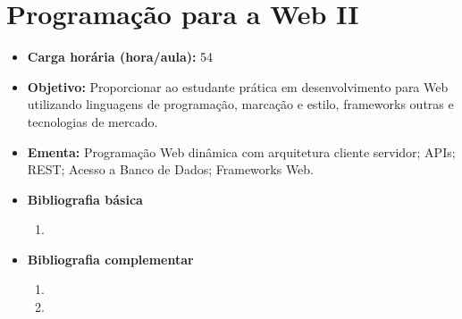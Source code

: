 \documentclass[11pt,fleqn]{book} %
\begin{document}


\newpage
\section{Programação para a Web II}\label{5_ppw2}
\begin{itemize}
	\item \textbf{Carga horária (hora/aula):} 54
	\item \textbf{Objetivo:} Proporcionar ao estudante prática em desenvolvimento para Web utilizando linguagens de programação, marcação e estilo, frameworks outras e tecnologias de mercado.
	\item \textbf{Ementa:} 
	Programação Web dinâmica com arquitetura cliente servidor;
	APIs;
	REST;
	Acesso a Banco de Dados;
	Frameworks Web.
	\item \textbf{Bibliografia básica}
	\begin{enumerate}
		\item 
	\end{enumerate}
	\item \textbf{Bibliografia complementar}
	\begin{enumerate}
		\item
		\item 
	\end{enumerate}
\end{itemize}


\newpage
\end{document}

